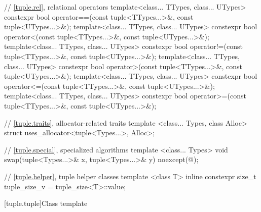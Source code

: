 \begin{codeblock}
{  // \ref{tuple.rel}, relational operators
  template<class... TTypes, class... UTypes>
    constexpr bool operator==(const tuple<TTypes...>&, const tuple<UTypes...>&);
  template<class... TTypes, class... UTypes>
    constexpr bool operator<(const tuple<TTypes...>&, const tuple<UTypes...>&);
  template<class... TTypes, class... UTypes>
    constexpr bool operator!=(const tuple<TTypes...>&, const tuple<UTypes...>&);
  template<class... TTypes, class... UTypes>
    constexpr bool operator>(const tuple<TTypes...>&, const tuple<UTypes...>&);
  template<class... TTypes, class... UTypes>
    constexpr bool operator<=(const tuple<TTypes...>&, const tuple<UTypes...>&);
  template<class... TTypes, class... UTypes>
    constexpr bool operator>=(const tuple<TTypes...>&, const tuple<UTypes...>&);

  // \ref{tuple.traits}, allocator-related traits
  template <class... Types, class Alloc>
    struct uses_allocator<tuple<Types...>, Alloc>;

  // \ref{tuple.special}, specialized algorithms
  template <class... Types>
    void swap(tuple<Types...>& x, tuple<Types...>& y) noexcept(@\seebelow@);

  // \ref{tuple.helper}, tuple helper classes
  template <class T>
    inline constexpr size_t tuple_size_v = tuple_size<T>::value;
}
\end{codeblock}

[tuple.tuple]{Class template }
%

